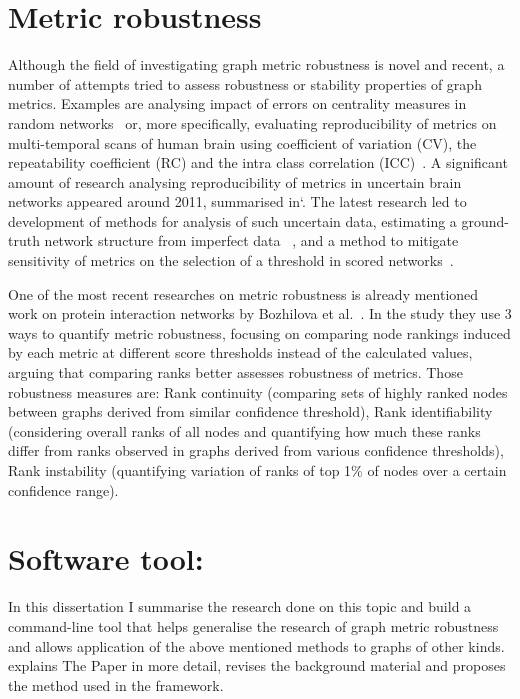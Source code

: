 \section{Metric robustness}

Although the field of investigating graph metric robustness is novel and recent, a number of attempts tried to assess robustness or stability properties of graph metrics.
Examples are analysing impact of errors on centrality measures in random networks~\cite{BorgattiRobustnessCentralityMeasures2006} or, more specifically, evaluating reproducibility of metrics on multi-temporal scans of human brain using coefficient of variation (CV), the repeatability coefficient (RC) and the intra class correlation (ICC)~\cite{VaessenEffectReproducibilityDifferent2010,DennisTestRetestReliabilityGraph2012}.
A significant amount of research analysing reproducibility of metrics in uncertain brain networks appeared around 2011, summarised in`\cite{TelesfordExplorationGraphMetric2013}.
The latest research led to development of methods for analysis of such uncertain data, estimating a ground-truth network structure from imperfect data ~\cite{Martin2016,Newman2018}, and a method to mitigate sensitivity of metrics on the selection of a threshold in scored networks~\cite{Drakesmith2015}.

One of the most recent researches on metric robustness is already mentioned work on protein interaction networks by Bozhilova et al.~\cite{Bozhilova2019}.
In the study they use 3 ways to quantify metric robustness, focusing on comparing node rankings induced by each metric at different score thresholds instead of the calculated values, arguing that comparing ranks better assesses robustness of metrics.
Those robustness measures are: Rank continuity (comparing sets of highly ranked nodes between graphs derived from similar confidence threshold), Rank identifiability (considering overall ranks of all nodes and quantifying how much these ranks differ from ranks observed in graphs derived from various confidence thresholds), Rank instability (quantifying variation of ranks of top 1\% of nodes over a certain confidence range).


\section{Software tool: \graffs}


In this dissertation I summarise the research done on this topic and build a command-line tool that helps generalise the research of graph metric robustness and allows application of the above mentioned methods to graphs of other kinds.
 explains The Paper in more detail, revises the background material and proposes the method used in the framework.

